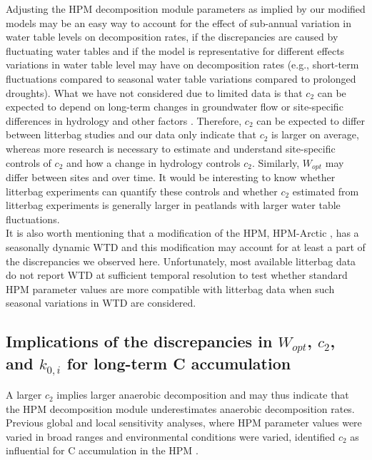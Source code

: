 \documentclass[esd, manuscript]{copernicus}
\begin{document}
Adjusting the HPM decomposition module parameters as implied by our modified models may be an easy way to account for the effect of sub-annual variation in water table levels on decomposition rates, if the discrepancies are caused by fluctuating water tables and if the model is representative for different effects variations in water table level may have on decomposition rates (e.g., short-term fluctuations compared to seasonal water table variations compared to prolonged droughts). What we have not considered due to limited data is that \(c_2\) can be expected to depend on long-term changes in groundwater flow \citep[e.g.,][]{Siegel.1995} or site-specific differences in hydrology and other factors \citep[e.g.,][]{Frolking.2010, Treat.2021, Treat.2022}. Therefore, \(c_2\) can be expected to differ between litterbag studies and our data only indicate that \(c_2\) is larger on average, whereas more research is necessary to estimate and understand site-specific controls of \(c_2\) and how a change in hydrology controls \(c_2\). Similarly, \(W_{opt}\) may differ between sites and over time. It would be interesting to know whether litterbag experiments can quantify these controls and whether \(c_2\) estimated from litterbag experiments is generally larger in peatlands with larger water table fluctuations.\\
It is also worth mentioning that a modification of the HPM, HPM-Arctic \citep{Treat.2021}, has a seasonally dynamic WTD and this modification may account for at least a part of the discrepancies we observed here. Unfortunately, most available litterbag data do not report WTD at sufficient temporal resolution to test whether standard HPM parameter values are more compatible with litterbag data when such seasonal variations in WTD are considered.

\hypertarget{out-discussion-5}{%
\subsection{\texorpdfstring{Implications of the discrepancies in \(W_{opt}\), \(c_2\), and \(k_{0,i}\) for long-term C accumulation}{Implications of the discrepancies in W\_\{opt\}, c\_2, and k\_\{0,i\} for long-term C accumulation}}\label{out-discussion-5}}

A larger \(c_2\) implies larger anaerobic decomposition and may thus indicate that the HPM decomposition module underestimates anaerobic decomposition rates. Previous global and local sensitivity analyses, where HPM parameter values were varied in broad ranges and environmental conditions were varied, identified \(c_2\) as influential for C accumulation in the HPM \citep{Quillet.2013, Quillet.2013a}.
\end{document}
